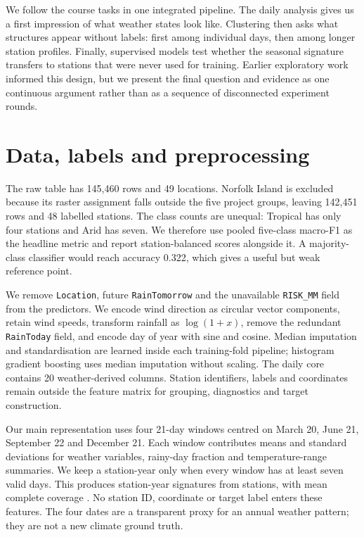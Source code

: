 \documentclass{article}
\begin{document}
We follow the course tasks in one integrated pipeline. The daily analysis gives us a first impression of what weather states look like. Clustering then asks what structures appear without labels: first among individual days, then among longer station profiles. Finally, supervised models test whether the seasonal signature transfers to stations that were never used for training. Earlier exploratory work informed this design, but we present the final question and evidence as one continuous argument rather than as a sequence of disconnected experiment rounds.

\section{Data, labels and preprocessing}
The raw table has 145,460 rows and 49 locations. Norfolk Island is excluded because its raster assignment falls outside the five project groups, leaving 142,451 rows and 48 labelled stations. The class counts are unequal: Tropical has only four stations and Arid has seven. We therefore use pooled five-class macro-F1 as the headline metric and report station-balanced scores alongside it. A majority-class classifier would reach accuracy 0.322, which gives a useful but weak reference point.

We remove \texttt{Location}, future \texttt{RainTomorrow} and the unavailable \texttt{RISK\_MM} field from the predictors. We encode wind direction as circular vector components, retain wind speeds, transform rainfall as $\log(1+x)$, remove the redundant \texttt{RainToday} field, and encode day of year with sine and cosine. Median imputation and standardisation are learned inside each training-fold pipeline; histogram gradient boosting uses median imputation without scaling. The daily core contains 20 weather-derived columns. Station identifiers, labels and coordinates remain outside the feature matrix for grouping, diagnostics and target construction.

Our main representation uses four 21-day windows centred on March 20, June 21, September 22 and December 21. Each window contributes means and standard deviations for weather variables, rainy-day fraction and temperature-range summaries. We keep a station-year only when every window has at least seven valid days. This produces \SeasonRows{} station-year signatures from \SeasonStations{} stations, with mean complete coverage \SeasonCoverage{}. No station ID, coordinate or target label enters these features. The four dates are a transparent proxy for an annual weather pattern; they are not a new climate ground truth.
\end{document}
